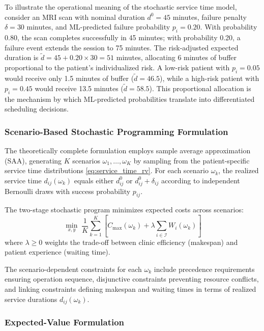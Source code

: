 \documentclass[11pt,a4paper]{article}
\begin{document}
To illustrate the operational meaning of the stochastic service time model, consider an MRI scan with nominal duration $d^0 = 45$ minutes, failure penalty $\delta = 30$ minutes, and ML-predicted failure probability $p_i = 0.20$. With probability 0.80, the scan completes successfully in 45 minutes; with probability 0.20, a failure event extends the session to 75 minutes. The risk-adjusted expected duration is $\tilde{d} = 45 + 0.20 \times 30 = 51$ minutes, allocating 6 minutes of buffer proportional to the patient's individualized risk. A low-risk patient with $p_i = 0.05$ would receive only 1.5 minutes of buffer ($\tilde{d} = 46.5$), while a high-risk patient with $p_i = 0.45$ would receive 13.5 minutes ($\tilde{d} = 58.5$). This proportional allocation is the mechanism by which ML-predicted probabilities translate into differentiated scheduling decisions.


\subsubsection{Scenario-Based Stochastic Programming Formulation}

The theoretically complete formulation employs sample average approximation (SAA), generating $K$ scenarios $\omega_1, \ldots, \omega_K$ by sampling from the patient-specific service time distributions \eqref{eq:service_time_rv}. For each scenario $\omega_k$, the realized service time $d_{ij}(\omega_k)$ equals either $d_{ij}^0$ or $d_{ij}^0 + \delta_{ij}$ according to independent Bernoulli draws with success probability $p_{ij}$.

The two-stage stochastic program minimizes expected costs across scenarios:
\begin{equation}
\min_{x, y} \; \frac{1}{K} \sum_{k=1}^{K} \left[ C_{\max}(\omega_k) + \lambda \sum_{i \in \mathcal{I}} W_i(\omega_k) \right]
\label{eq:saa_objective}
\end{equation}
where $\lambda \geq 0$ weights the trade-off between clinic efficiency (makespan) and patient experience (waiting time).

The scenario-dependent constraints for each $\omega_k$ include precedence requirements ensuring operation sequence, disjunctive constraints preventing resource conflicts, and linking constraints defining makespan and waiting times in terms of realized service durations $d_{ij}(\omega_k)$.

\subsubsection{Expected-Value Formulation}
\end{document}
